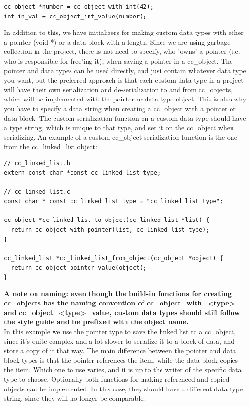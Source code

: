 \documentclass[table]{ituthesis}
\begin{document}
\begin{lstlisting}[label=cc_object-serialization,caption=Example of how to serialize an int to and from a cc\_object]
cc_object *number = cc_object_with_int(42);
int in_val = cc_object_int_value(number);
\end{lstlisting}
	
In addition to this, we have initializers for making custom data types with ether a pointer (void *) or a data block with a length. Since we are using garbage collection in the project, there is not need to specify, who "owns" a pointer (i.e. who is responsible for free'ing it), when saving a pointer in a cc\_object. The pointer and data types can be used directly, and just contain whatever data type you want, but the preferred approach is that each custom data type in a project will have their own serialization and de-serialization to and from cc\_objects, which will be implemented with the pointer or data type object. This is also why you have to specify a data string when creating a cc\_object with a pointer or data block. The custom serialization function on a custom data type should have a type string, which is unique to that type, and set it on the cc\_object when serializing. An example of a custom cc\_object serialization function is the one from the cc\_linked\_list object:

\begin{lstlisting}[label=custom-serialization,caption=Example of how to implement custom serialization]
// cc_linked_list.h
extern const char *const cc_linked_list_type;

// cc_linked_list.c
const char * const cc_linked_list_type = "cc_linked_list_type";

cc_object *cc_linked_list_to_object(cc_linked_list *list) {
  return cc_object_with_pointer(list, cc_linked_list_type);
}

cc_linked_list *cc_linked_list_from_object(cc_object *object) {
  return cc_object_pointer_value(object);
}
\end{lstlisting}

\textbf{A note on naming: even though the build-in functions for creating cc\_objects has the naming convention of cc\_object\_with\_<type> and cc\_object\_<type>\_value, custom data types should still follow the style guide and be prefixed with the object name.}\\

In this example we use the pointer type to save the linked list to a cc\_object, since it's quite complex and a lot slower to serialize it to a block of data, and store a copy of it that way. The main difference between the pointer and data block types is that the pointer references the item, while the data block copies the item. Which one to use varies, and it is up to the writer of the specific data type to choose. Optionally both functions for making referenced and copied objects can be implemented. In this case, they should have a different data type string, since they will no longer be comparable.
\end{document}
